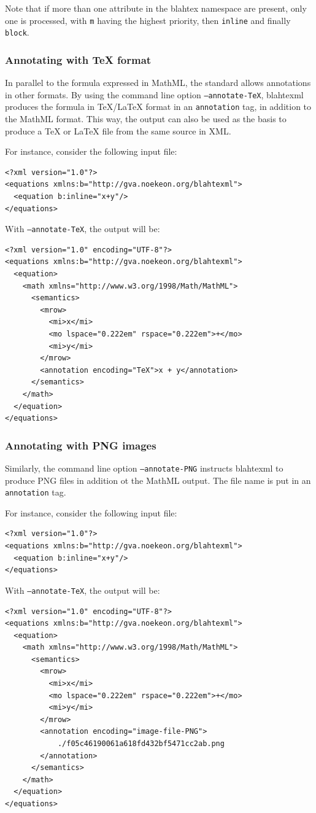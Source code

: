 \documentclass{article}
\begin{document}
Note that if more than one attribute in the blahtex namespace are present, only one is processed, with \texttt{m} having the highest priority, then \texttt{inline} and finally \texttt{block}.

\subsubsection{Annotating with \TeX{} format}

In parallel to the formula expressed in MathML, the standard allows annotations in other formats. By using the command line option \texttt{--annotate-TeX}, blahtexml produces the formula in \TeX/\LaTeX{} format in an \texttt{annotation} tag, in addition to the MathML format. This way, the output can also be used as the basis to produce a \TeX{} or \LaTeX{} file from the same source in XML.

For instance, consider the following input file:
\begin{verbatim}
<?xml version="1.0"?>
<equations xmlns:b="http://gva.noekeon.org/blahtexml">
  <equation b:inline="x+y"/>
</equations>
\end{verbatim}
With \texttt{--annotate-TeX}, the output will be:
\begin{verbatim}
<?xml version="1.0" encoding="UTF-8"?>
<equations xmlns:b="http://gva.noekeon.org/blahtexml">
  <equation>
    <math xmlns="http://www.w3.org/1998/Math/MathML">
      <semantics>
        <mrow>
          <mi>x</mi>
          <mo lspace="0.222em" rspace="0.222em">+</mo>
          <mi>y</mi>
        </mrow>
        <annotation encoding="TeX">x + y</annotation>
      </semantics>
    </math>
  </equation>
</equations>
\end{verbatim}

\subsubsection{Annotating with PNG images}

Similarly, the command line option \texttt{--annotate-PNG} instructs blahtexml to produce PNG files in addition ot the MathML output. The file name is put in an \texttt{annotation} tag.

For instance, consider the following input file:
\begin{verbatim}
<?xml version="1.0"?>
<equations xmlns:b="http://gva.noekeon.org/blahtexml">
  <equation b:inline="x+y"/>
</equations>
\end{verbatim}
With \texttt{--annotate-TeX}, the output will be:
\begin{verbatim}
<?xml version="1.0" encoding="UTF-8"?>
<equations xmlns:b="http://gva.noekeon.org/blahtexml">
  <equation>
    <math xmlns="http://www.w3.org/1998/Math/MathML">
      <semantics>
        <mrow>
          <mi>x</mi>
          <mo lspace="0.222em" rspace="0.222em">+</mo>
          <mi>y</mi>
        </mrow>
        <annotation encoding="image-file-PNG">
            ./f05c46190061a618fd432bf5471cc2ab.png
        </annotation>
      </semantics>
    </math>
  </equation>
</equations>
\end{verbatim}
\end{document}
